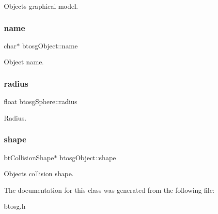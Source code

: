 Object\textquotesingle{}s graphical model. 

\mbox{\label{classbtosgObject_a12396e1362797a75473a2e833b579cc9}} 
\subsubsection{\texorpdfstring{name}{name}}
{\footnotesize\ttfamily char$\ast$ btosg\+Object\+::name\hspace{0.3cm}{\ttfamily [inherited]}}



Object name. 

\mbox{\label{classbtosgSphere_afd570c85e9ce1b15b2b4b378e4f6abeb}} 
\subsubsection{\texorpdfstring{radius}{radius}}
{\footnotesize\ttfamily float btosg\+Sphere\+::radius}



Radius. 

\mbox{\label{classbtosgObject_a0f6a8da01cf643c321bffe86e42604b0}} 
\subsubsection{\texorpdfstring{shape}{shape}}
{\footnotesize\ttfamily bt\+Collision\+Shape$\ast$ btosg\+Object\+::shape\hspace{0.3cm}{\ttfamily [inherited]}}



Object\textquotesingle{}s collision shape. 



The documentation for this class was generated from the following file\+:\begin{DoxyCompactItemize}
\item 
btosg.\+h\end{DoxyCompactItemize}
